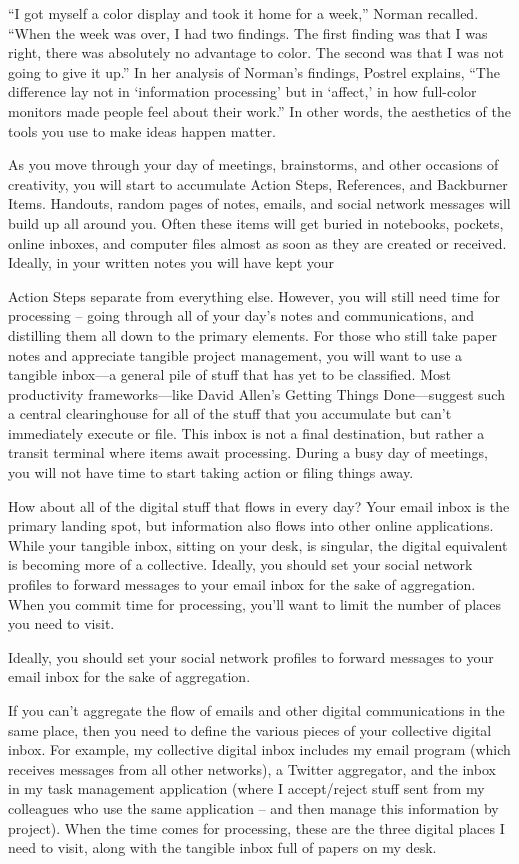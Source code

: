 “I got myself a color display and took it home for a week,” Norman recalled. “When the week was over, I had two findings. The first finding was that I was right, there was absolutely no advantage to color. The second was that I was not going to give it up.” In her analysis of Norman’s findings, Postrel explains, “The difference lay not in ‘information processing’ but in ‘affect,’ in how full-color monitors made people feel about their work.” In other words, the aesthetics of the tools you use to make ideas happen matter.


As you move through your day of meetings, brainstorms, and other occasions of creativity, you will start to accumulate Action Steps, References, and Backburner Items. Handouts, random pages of notes, emails, and social network messages will build up all around you. Often these items will get buried in notebooks, pockets, online inboxes, and computer files almost as soon as they are created or received. Ideally, in your written notes you will have kept your

Action Steps separate from everything else. However, you will still need time for processing – going through all of your day’s notes and communications, and distilling them all down to the primary elements. For those who still take paper notes and appreciate tangible project management, you will want to use a tangible inbox—a general pile of stuff that has yet to be classified. Most productivity frameworks—like David Allen’s Getting Things Done—suggest such a central clearinghouse for all of the stuff that you accumulate but can’t immediately execute or file. This inbox is not a final destination, but rather a transit terminal where items await processing. During a busy day of meetings, you will not have time to start taking action or filing things away.

How about all of the digital stuff that flows in every day? Your email inbox is the primary landing spot, but information also flows into other online applications. While your tangible inbox, sitting on your desk, is singular, the digital equivalent is becoming more of a collective. Ideally, you should set your social network profiles to forward messages to your email inbox for the sake of aggregation. When you commit time for processing, you’ll want to limit the number of places you need to visit.

Ideally, you should set your social network profiles to forward messages to your email inbox for the sake of aggregation.

If you can’t aggregate the flow of emails and other digital communications in the same place, then you need to define the various pieces of your collective digital inbox. For example, my collective digital inbox includes my email program (which receives messages from all other networks), a Twitter aggregator, and the inbox in my task management application (where I accept/reject stuff sent from my colleagues who use the same application – and then manage this information by project). When the time comes for processing, these are the three digital places I need to visit, along with the tangible inbox full of papers on my desk.


